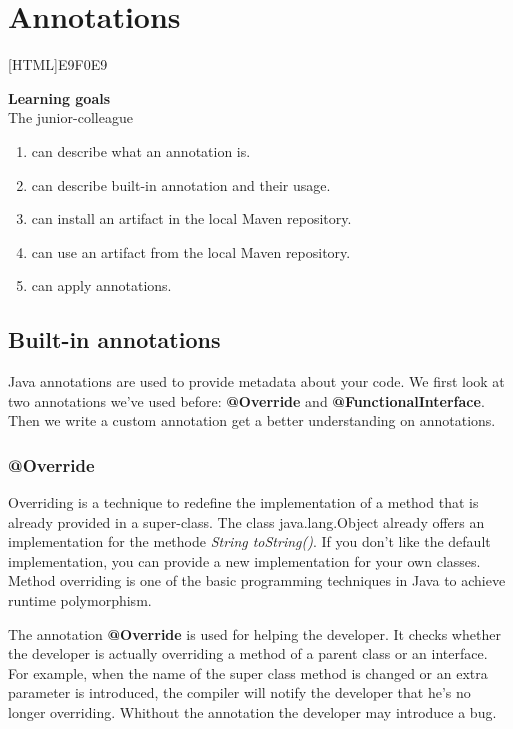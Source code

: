 \chapter{Annotations}

[HTML]{E9F0E9}{\parbox{\textwidth}{%
\noindent \textbf{Learning goals}\\
The junior-colleague
\begin{enumerate}[nolistsep]
\item can describe what an annotation is.
\item can describe built-in annotation and their usage.
\item can install an artifact in the local Maven repository.
\item can use an artifact from the local Maven repository.
\item can apply annotations.
\end{enumerate}}}

\section{Built-in annotations}

Java annotations are used to provide metadata about your code.
We first look at two annotations we've used before: \textbf{@Override} and \textbf{@FunctionalInterface}.  Then we write a custom annotation get a better understanding on annotations.

\subsection{@Override}

Overriding is a technique to redefine the implementation of a method that is already provided in a super-class.  The class java.lang.Object already offers an implementation for the methode \textit{String toString()}.  If you don't like the default implementation, you can provide a new implementation for your own classes.  Method overriding is one of the basic programming techniques in Java to achieve runtime polymorphism. 

The annotation \textbf{@Override} is used for helping the developer.  It checks whether the developer is actually overriding a method of a parent class or an interface. 
For example, when the name of the super class method is changed or an extra parameter is introduced, the compiler will notify the developer that he's no longer overriding.  Whithout the annotation the developer may introduce a bug.

